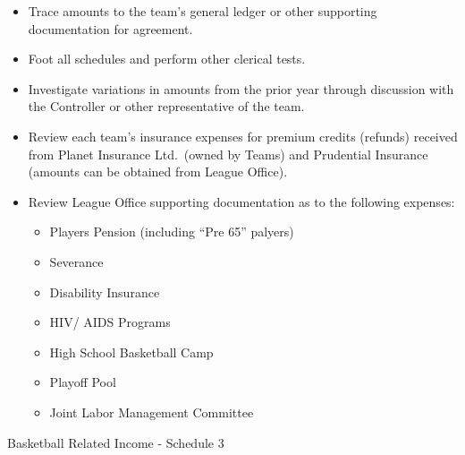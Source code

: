 \documentclass[
]{book}
\providecommand{\tightlist}{%
  \setlength{\itemsep}{0pt}\setlength{\parskip}{0pt}}
\begin{document}
\begin{itemize}
\tightlist
\item
  Trace amounts to the team's general ledger or other supporting documentation for agreement.
\item
  Foot all schedules and perform other clerical tests.
\item
  Investigate variations in amounts from the prior year through discussion with the Controller or other representative of the team.
\item
  Review each team's insurance expenses for premium credits (refunds) received from Planet Insurance Ltd.~(owned by Teams) and Prudential Insurance (amounts can be obtained from League Office).
\item
  Review League Office supporting documentation as to the following expenses:

  \begin{itemize}
  \tightlist
  \item
    Players Pension (including ``Pre 65'' palyers)
  \item
    Severance
  \item
    Disability Insurance
  \item
    HIV/ AIDS Programs
  \item
    High School Basketball Camp
  \item
    Playoff Pool
  \item
    Joint Labor Management Committee
  \end{itemize}
\end{itemize}

Basketball Related Income - Schedule 3
\end{document}
